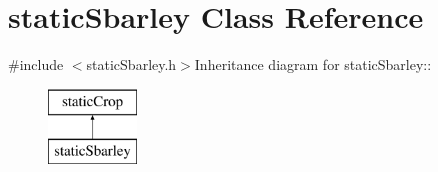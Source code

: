 \hypertarget{classstatic_sbarley}{
\section{staticSbarley Class Reference}
\label{classstatic_sbarley}
}


{\ttfamily \#include $<$staticSbarley.h$>$}Inheritance diagram for staticSbarley::\begin{figure}[H]
\begin{center}
\leavevmode
\includegraphics[height=2cm]{classstatic_sbarley}
\end{center}
\end{figure}
